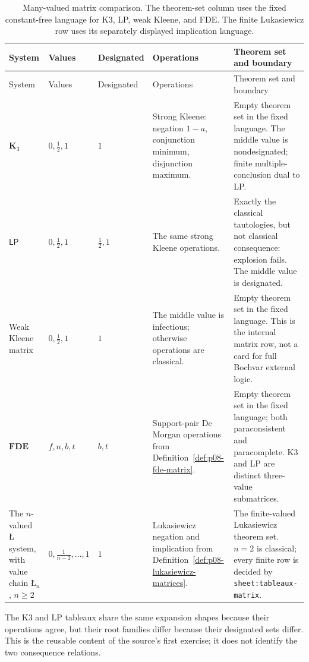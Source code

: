 \begin{landscape}
\begin{longtable}{@{}p{.10\linewidth}p{.16\linewidth}p{.13\linewidth}p{.27\linewidth}p{.25\linewidth}@{}}
\caption{Many-valued matrix comparison.  The theorem-set
column uses the fixed constant-free language for K3, LP, weak Kleene, and FDE.
The finite Lukasiewicz row uses its separately displayed implication language.}
\label{tab:p08-many-valued-matrices}\\
\toprule
System & Values & Designated & Operations & Theorem set and boundary \\
\midrule
\endfirsthead
\toprule
System & Values & Designated & Operations & Theorem set and boundary \\
\midrule
\endhead
\(\mathbf K_3\) & \(0,\tfrac12,1\) & \(1\) & Strong Kleene:
negation \(1-a\), conjunction minimum, disjunction maximum. & Empty theorem
set in the fixed language.  The middle value is nondesignated; finite
multiple-conclusion dual to LP. \\
\addlinespace
\(\mathsf{LP}\) & \(0,\tfrac12,1\) & \(\tfrac12,1\) & The same strong
Kleene operations. & Exactly the classical tautologies, but not classical
consequence: explosion fails.  The middle value is designated. \\
\addlinespace
Weak Kleene matrix & \(0,\tfrac12,1\) & \(1\) &
The middle value is infectious; otherwise operations are classical. & Empty
theorem set in the fixed language.  This is the internal matrix row, not a
card for full Bochvar external logic. \\
\addlinespace
\(\mathbf{FDE}\) & \(f,n,b,t\) &
\(b,t\) & Support-pair De Morgan operations from
Definition~\ref{def:p08-fde-matrix}. & Empty theorem set in the fixed language;
both paraconsistent and paracomplete.  K3 and LP are distinct three-value
submatrices. \\
\addlinespace
The \(n\)-valued \(\text{\L}\) system, with value chain \(\text{\L}_n\),
\(n\geq2\) &
\(0,\frac1{n-1},\ldots,1\) & \(1\) & Lukasiewicz negation and implication
from Definition~\ref{def:p08-lukasiewicz-matrices}. & The finite-valued
Lukasiewicz theorem set.  \(n=2\) is classical; every finite row is decided by
\texttt{sheet:tableaux-matrix}. \\
\bottomrule
\end{longtable}
\end{landscape}

The K3 and LP tableaux share the same expansion shapes because their
operations agree, but their root families differ because their designated sets
differ.  This is the reusable content of the source's first exercise; it does
not identify the two consequence relations.

